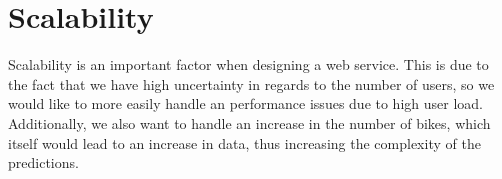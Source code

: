 \section{Scalability}
Scalability is an important factor when designing a web service.
This is due to the fact that we have high uncertainty in regards to the number of users, so we would like to more easily handle an performance issues due to high user load.
Additionally, we also want to handle an increase in the number of bikes, which itself would lead to an increase in data, thus increasing the complexity of the predictions.

